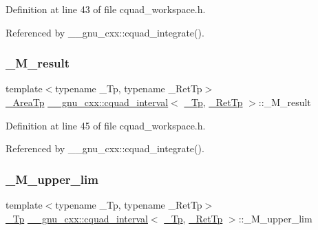Definition at line 43 of file cquad\+\_\+workspace.\+h.



Referenced by \+\_\+\+\_\+gnu\+\_\+cxx\+::cquad\+\_\+integrate().

\mbox{\label{struct____gnu__cxx_1_1cquad__interval_abb2d5586cea60c80bd99051f2ba27063}} 
\subsubsection{\texorpdfstring{\+\_\+\+M\+\_\+result}{\_M\_result}}
{\footnotesize\ttfamily template$<$typename \+\_\+\+Tp, typename \+\_\+\+Ret\+Tp$>$ \\
\hyperlink{struct____gnu__cxx_1_1cquad__interval_aceac510aa3323d55b31555f96133cb40}{\+\_\+\+Area\+Tp} \hyperlink{struct____gnu__cxx_1_1cquad__interval}{\+\_\+\+\_\+gnu\+\_\+cxx\+::cquad\+\_\+interval}$<$ \hyperlink{namespace____gnu__cxx_a3b19a9c800ca194374ef9172290f7d79}{\+\_\+\+Tp}, \hyperlink{namespace____gnu__cxx_a886e03ece3d53ff7fa6c098a40f93fa5}{\+\_\+\+Ret\+Tp} $>$\+::\+\_\+\+M\+\_\+result}



Definition at line 45 of file cquad\+\_\+workspace.\+h.



Referenced by \+\_\+\+\_\+gnu\+\_\+cxx\+::cquad\+\_\+integrate().

\mbox{\label{struct____gnu__cxx_1_1cquad__interval_a60b4fdf494ba274bce6271fd1fa5aa69}} 
\subsubsection{\texorpdfstring{\+\_\+\+M\+\_\+upper\+\_\+lim}{\_M\_upper\_lim}}
{\footnotesize\ttfamily template$<$typename \+\_\+\+Tp, typename \+\_\+\+Ret\+Tp$>$ \\
\hyperlink{namespace____gnu__cxx_a3b19a9c800ca194374ef9172290f7d79}{\+\_\+\+Tp} \hyperlink{struct____gnu__cxx_1_1cquad__interval}{\+\_\+\+\_\+gnu\+\_\+cxx\+::cquad\+\_\+interval}$<$ \hyperlink{namespace____gnu__cxx_a3b19a9c800ca194374ef9172290f7d79}{\+\_\+\+Tp}, \hyperlink{namespace____gnu__cxx_a886e03ece3d53ff7fa6c098a40f93fa5}{\+\_\+\+Ret\+Tp} $>$\+::\+\_\+\+M\+\_\+upper\+\_\+lim}



